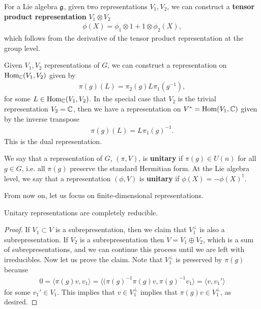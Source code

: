 \documentclass{../mathnotes}
\begin{document}
\begin{defn}
    For a Lie algebra $\mathfrak g$, given two representations $V_1,V_2$, we can construct a \textbf{tensor product representation} $V_1\otimes V_2$
    \begin{align*}
        \phi(X)=\phi_1\otimes 1 + 1\otimes \phi_2(X),
    \end{align*}
    which follows from the derivative of the tensor product representation at the group level.
\end{defn}

\begin{defn}
    Given $V_1,V_2$ representations of $G$, we can construct a representation on $\operatorname{Hom}_{\mathbb{C}}(V_1,V_2)$ given by
    \begin{align*}
        \pi(g)(L)=\pi_2(g)L\pi_1(g^{-1}),
    \end{align*}
    for some $L\in\operatorname{Hom}_{\mathbb{C}}(V_1,V_2)$. In the special case that $V_2$ is the trivial representation $V_2=\mathbb{C}$, then we have
    a representation on $V^*=\operatorname{Hom}(V_1,\mathbb{C})$ given by the inverse transpose
    \begin{align*}
        \pi(g)(L)=L\pi_1(g)^{-1}.
    \end{align*}
    This is the dual representation.
\end{defn}

\begin{defn}
    We say that a representation of $G$, $(\pi, V)$, is \textbf{unitary} if $\pi(g)\in U(n)$ for all $g\in G$, i.e. all $\pi(g)$ preserve the standard Hermitian form.
    At the Lie algebra level, we say that a representation $(\phi,V)$ is \textbf{unitary} if $\phi(X)=-\phi(X)^\dagger$.
\end{defn}

From now on, let us focus on finite-dimensional representations.

\begin{thm}
    Unitary representations are completely reducible.
\end{thm}
\begin{proof}
    If $V_1\subset V$ is a subrepresentation, then we claim that $V_1^\perp$ is also a subrepresentation. If $V_2$ is a subrepresentation
    then $V=V_1\oplus V_2$, which is a sum of subrepresentations, and we can continue this process until we are left with irreducibles.
    Now let us prove the claim. Note that $V_1^\perp$ is preserved by $\pi(g)$ because
    \begin{align*}
        0=\langle\pi(g)v,v_1\rangle=\langle(\pi(g)^{-1}\pi(g)v,\pi(g)^{-1}v_1\rangle=\langle v,v_1'\rangle
    \end{align*}
    for some $v_1'\in V_1$. This implies that $v\in V_1^\perp$ implies that $\pi(g)v\in V_1^\perp$, as desired.
\end{proof}
\end{document}
